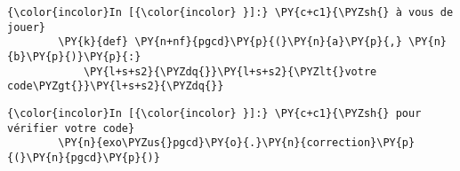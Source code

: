     \begin{Verbatim}[commandchars=\\\{\}]
{\color{incolor}In [{\color{incolor} }]:} \PY{c+c1}{\PYZsh{} à vous de jouer}
        \PY{k}{def} \PY{n+nf}{pgcd}\PY{p}{(}\PY{n}{a}\PY{p}{,} \PY{n}{b}\PY{p}{)}\PY{p}{:}
            \PY{l+s+s2}{\PYZdq{}}\PY{l+s+s2}{\PYZlt{}votre code\PYZgt{}}\PY{l+s+s2}{\PYZdq{}}
\end{Verbatim}


    \begin{Verbatim}[commandchars=\\\{\}]
{\color{incolor}In [{\color{incolor} }]:} \PY{c+c1}{\PYZsh{} pour vérifier votre code}
        \PY{n}{exo\PYZus{}pgcd}\PY{o}{.}\PY{n}{correction}\PY{p}{(}\PY{n}{pgcd}\PY{p}{)}
\end{Verbatim}